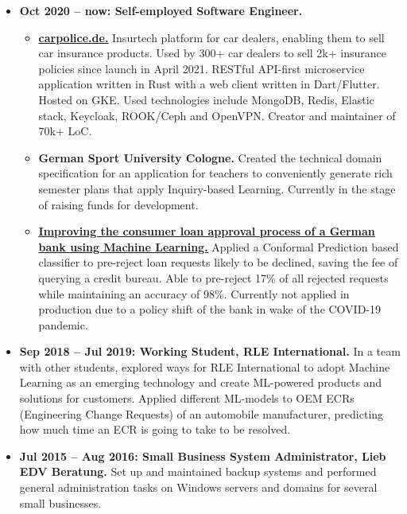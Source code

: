 \documentclass[10pt]{article}
\begin{document}
\begin{itemize}[label={}, leftmargin=*]

\item \textbf{Oct 2020 -- now: Self-employed Software Engineer.}

  \begin{itemize}[label=\bullet, leftmargin=*]
    \item \textbf{\underline{\href{https://carpolice.de}{carpolice.de.}}}
      Insurtech platform for car dealers, enabling them to sell
      car insurance products.
      Used by 300+ car dealers to sell 2k+ insurance policies since
      launch in April 2021.
      RESTful API-first microservice application written in Rust with
      a web client written in Dart/Flutter.
      Hosted on GKE.
      Used technologies include MongoDB, Redis, Elastic stack,
      Keycloak, ROOK/Ceph and OpenVPN.
      Creator and maintainer of 70k+ LoC.

    \item \textbf{German Sport University Cologne.}
      Created the technical domain specification for an
      application for teachers to conveniently generate rich semester
      plans that apply Inquiry-based Learning.
      Currently in the stage of raising funds for development.

    \item \textbf{\underline{\href{https://fassbender.dev/static/cp_for_loan_approval_prediction.pdf}{%
        Improving the consumer loan approval process of a German bank using Machine Learning.}}}
      Applied a Conformal Prediction based classifier to pre-reject
      loan requests likely to be declined, saving the fee of querying
      a credit bureau.
      Able to pre-reject 17\% of all rejected requests while
      maintaining an accuracy of 98\%.
      Currently not applied in production due to a policy shift of the
      bank in wake of the COVID-19 pandemic.
  \end{itemize}

\item \textbf{Sep 2018 -- Jul 2019: Working Student, RLE International.}
In a team with other students, explored ways for RLE
International to adopt Machine Learning as an emerging technology and
create ML-powered products and solutions for customers.
Applied different ML-models to OEM ECRs (Engineering Change Requests)
of an automobile manufacturer, predicting how much time an ECR is
going to take to be resolved.

\item \textbf{Jul 2015 -- Aug 2016: Small Business System Administrator,
Lieb EDV Beratung.}
Set up and maintained backup systems and performed general
administration tasks on Windows servers and domains for several small
businesses.

\end{itemize}
\end{document}
